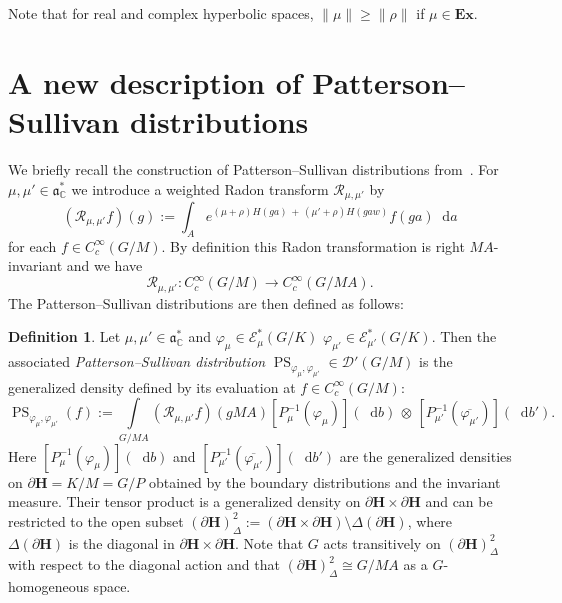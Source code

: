 \documentclass[10pt]{amsart}
\theoremstyle{definition}
\newtheorem{defi}[cdrthm]{Definition}
\newcommand{\mc}{\mathcal}
\newcommand{\cc}{\mathbb{C}}
\newcommand{\bfh}{\mathbf{H}}
\newcommand{\pl}{\partial}
\newcommand{\intd}{\mathop{}\!\mathrm{d}}
\renewcommand{\a}{\mathfrak a}
\begin{document}
Note that for real and complex hyperbolic spaces, $\|\mu\|\geq \|\rho\|$ if $\mu\in \mathbf{Ex}$.

\section{A new description of Patterson--Sullivan distributions}\label{PatSul}

We briefly recall the construction of Patterson--Sullivan distributions from~\cite{AZ07,HHS12,HS09}. For $\mu,\mu'\in \a^*_\cc$ we introduce a weighted Radon transform $\mathcal R_{\mu,\mu'}$ by
\[
(\mathcal R_{\mu,\mu'} f)(g):=\int_A e^{(\mu+\rho)H(ga) \,+\,(\mu'+\rho)H(gaw)}f(ga) \intd a
\]
for each $f\in C_c^\infty(G/M)$. By definition this Radon transformation is right $MA$-invariant and we have~\cite[Lemma~4.4]{HHS12}
\[
\mathcal R_{\mu,\mu'}:C_c^\infty(G/M)\to C_c^\infty(G/MA).
\]
The Patterson--Sullivan distributions are then defined as follows:

\begin{defi}\label{def:PS}
Let $\mu,\mu'\in \a_{\cc}^*$ and $\varphi_\mu\in\mathcal E^*_\mu(G/K)$ $\varphi_{\mu'}\in\mathcal E^*_{\mu'}(G/K)$. Then the associated \emph{Patterson--Sullivan distribution} $\operatorname{PS}_{\varphi_\mu,\varphi_{\mu'}} \in \mc{D}'(G/M)$ is the generalized density defined by its evaluation at $f\in C_c^\infty(G/M)$:
\[
\operatorname{PS}_{\varphi_\mu,\varphi_{\mu'}}(f):= \int\limits_{G/MA}\left(\mathcal R_{\mu,\mu'} f\right)(gMA) \left[P_\mu^{-1}(\varphi_\mu)\right](\intd b)\,\otimes\, \left[P_{\mu'}^{-1}(\overline{\varphi_{\mu'}})\right](\intd b').
\]
Here $[P_\mu^{-1}(\varphi_\mu)](\intd b)$ and $[P_{\mu'}^{-1}(\overline{\varphi_{\mu'}})](\intd b')$ are the generalized densities on $\pl{\bfh}=K/M=G/P$ obtained by the boundary distributions and the invariant measure. Their tensor product is a generalized density on $\pl{\bfh}\times \pl{\bfh}$ and can be restricted to the open subset $(\pl{\bfh})^2_{\Delta}:= (\pl{\bfh}\times \pl{\bfh})\setminus \Delta(\pl{\bfh})$, where $\Delta(\pl{\bfh})$ is the diagonal in $\pl{\bfh}\times \pl{\bfh}$. Note that $G$ acts transitively on $(\pl{\bfh})_\Delta^2$ with respect to the diagonal action and that $(\pl{\bfh})_\Delta^2\cong G/MA$ as a $G$-homogeneous space.
\end{defi}
\end{document}
